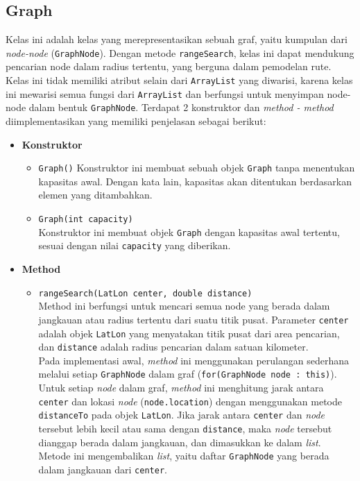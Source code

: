 \subsection{Graph}
Kelas ini adalah kelas yang merepresentasikan sebuah graf, yaitu kumpulan dari \textit{node-node} (\texttt{GraphNode}). Dengan metode \texttt{rangeSearch}, kelas ini dapat mendukung pencarian node dalam radius tertentu, yang berguna dalam pemodelan rute. Kelas ini tidak memiliki atribut selain dari \texttt{ArrayList} yang diwarisi, karena kelas ini mewarisi semua fungsi dari \texttt{ArrayList} dan berfungsi untuk menyimpan node-node dalam bentuk \texttt{GraphNode}. Terdapat 2 konstruktor dan \textit{method - method} diimplementasikan yang memiliki penjelasan sebagai berikut:
\begin{itemize}
    \item \textbf{Konstruktor}
    \begin{itemize}
        \item \texttt{Graph()}
        Konstruktor ini membuat sebuah objek \texttt{Graph} tanpa menentukan kapasitas awal. Dengan kata lain, kapasitas akan ditentukan berdasarkan elemen yang ditambahkan.
        \item \texttt{Graph(int capacity)}
        \\ Konstruktor ini membuat objek \texttt{Graph} dengan kapasitas awal tertentu, sesuai dengan nilai \texttt{capacity} yang diberikan.
    \end{itemize}

    \item \textbf{Method}
    \begin{itemize}
        \item \texttt{rangeSearch(LatLon center, double distance)}
        \\ Method ini berfungsi untuk mencari semua node yang berada dalam jangkauan atau radius tertentu dari suatu titik pusat. Parameter \texttt{center} adalah objek \texttt{LatLon} yang menyatakan titik pusat dari area pencarian, dan \texttt{distance} adalah radius pencarian dalam satuan kilometer.
        \\ Pada implementasi awal, \textit{method} ini menggunakan perulangan sederhana melalui setiap \texttt{GraphNode} dalam graf (\texttt{for(GraphNode node : this)}). Untuk setiap \textit{node} dalam graf, \textit{method} ini menghitung jarak antara \texttt{center} dan lokasi \textit{node} (\texttt{node.location}) dengan menggunakan metode \texttt{distanceTo} pada objek \texttt{LatLon}. Jika jarak antara \texttt{center} dan \textit{node} tersebut lebih kecil atau sama dengan \texttt{distance}, maka \textit{node} tersebut dianggap berada dalam jangkauan, dan dimasukkan ke dalam \textit{list}. Metode ini mengembalikan \textit{list}, yaitu daftar \texttt{GraphNode} yang berada dalam jangkauan dari \texttt{center}.
    \end{itemize}
\end{itemize}

